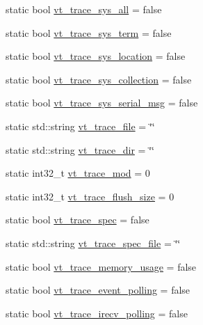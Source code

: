 \begin{DoxyCompactItemize}
\item 
static bool \hyperlink{structvt_1_1arguments_1_1_arg_config_a0f29a730468e776a3281e5cb2694395c}{vt\+\_\+trace\+\_\+sys\+\_\+all} = false
\item 
static bool \hyperlink{structvt_1_1arguments_1_1_arg_config_a3618f4c676020355d57dd29623959224}{vt\+\_\+trace\+\_\+sys\+\_\+term} = false
\item 
static bool \hyperlink{structvt_1_1arguments_1_1_arg_config_ad810a33c24ce08006af0bafeffce9ec8}{vt\+\_\+trace\+\_\+sys\+\_\+location} = false
\item 
static bool \hyperlink{structvt_1_1arguments_1_1_arg_config_ac4afb6f023f686f3ed1643394d3ea80c}{vt\+\_\+trace\+\_\+sys\+\_\+collection} = false
\item 
static bool \hyperlink{structvt_1_1arguments_1_1_arg_config_a44627a2ab6723ed7646511a12124325e}{vt\+\_\+trace\+\_\+sys\+\_\+serial\+\_\+msg} = false
\item 
static std\+::string \hyperlink{structvt_1_1arguments_1_1_arg_config_a296fe4ab5d11f984532b780ffcf74657}{vt\+\_\+trace\+\_\+file} = \char`\"{}\char`\"{}
\item 
static std\+::string \hyperlink{structvt_1_1arguments_1_1_arg_config_aa30e39d83c2391ff918f86f8d5009b3f}{vt\+\_\+trace\+\_\+dir} = \char`\"{}\char`\"{}
\item 
static int32\+\_\+t \hyperlink{structvt_1_1arguments_1_1_arg_config_acb14bb6b6f58db2a35bc71a4c6c06799}{vt\+\_\+trace\+\_\+mod} = 0
\item 
static int32\+\_\+t \hyperlink{structvt_1_1arguments_1_1_arg_config_a8f122ed882f2de1f03091edbe64f1f2b}{vt\+\_\+trace\+\_\+flush\+\_\+size} = 0
\item 
static bool \hyperlink{structvt_1_1arguments_1_1_arg_config_a5985e792d6c3810293b54dda059460bd}{vt\+\_\+trace\+\_\+spec} = false
\item 
static std\+::string \hyperlink{structvt_1_1arguments_1_1_arg_config_a0369ed37706b8e7d563cd8f25763a56c}{vt\+\_\+trace\+\_\+spec\+\_\+file} = \char`\"{}\char`\"{}
\item 
static bool \hyperlink{structvt_1_1arguments_1_1_arg_config_aa4ca0b4d3eedbe726b0c50d178dfb3bf}{vt\+\_\+trace\+\_\+memory\+\_\+usage} = false
\item 
static bool \hyperlink{structvt_1_1arguments_1_1_arg_config_a74daad7ed23750406ce4122cf8e9cfdd}{vt\+\_\+trace\+\_\+event\+\_\+polling} = false
\item 
static bool \hyperlink{structvt_1_1arguments_1_1_arg_config_aa6b37855e6e490e24a0aeb26125a7d1b}{vt\+\_\+trace\+\_\+irecv\+\_\+polling} = false

\end{DoxyCompactItemize}
